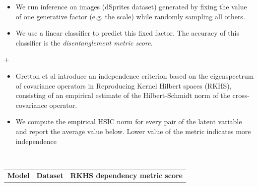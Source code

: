 \documentclass[a0]{a0poster}
\def\Head#1{\begin{center}\noindent{\LARGE\bf\color{Black}#1}\end{center}\bigskip}
\begin{document}
\begin{minipage}[t]{0.32\textwidth}
\Head{Analysis}
    \vspace{1cm}
    \begin{minipage}{1.0\columnwidth}
    \begin{minipage}{1.0\columnwidth}
    \begin{minipage}[t]{0.6\textwidth}
 \Large {}
 \begin{itemize}
 	\item We run inference on images (dSprites dataset) generated by fixing the value of one generative factor (e.g. the scale) while randomly sampling all others.
    \item We use a linear classifier to predict this fixed factor. The accuracy of this classifier is the \emph{disentanglement metric score}.
 \end{itemize}
 \end{minipage}\hfill
 \begin{minipage}[t]{0.37\textwidth}
+ \end{minipage}
 \vspace{1cm}
 \end{minipage}
  \Large {}
  \begin{itemize}
  \item Gretton et al \citep{Gretton:2005:MSD:2101372.2101382} introduce an independence criterion based on the eigenspectrum of covariance operators in Reproducing Kernel Hilbert spaces (RKHS), consisting of an empirical estimate of the Hilbert-Schmidt norm of the cross-covariance operator.
  \item We compute the empirical HSIC norm for every pair of the latent variable and report the average value below. Lower value of the metric indicates more independence
  \end{itemize}
    \vspace{0.1cm}
    \end{minipage}
\vspace{0.1cm} 
\Head{Results}
\vspace{0.1cm}
     {\Large {}}\\[1cm]
     \begin{minipage}{\columnwidth}
     	\Large
        \centering
       \begin{tabular}{|>{\centering}m{10cm}|c|c|}
       	\hline
          \textbf{Model} & \textbf{Dataset} &  \textbf{RKHS dependency metric score}\\

\end{tabular}
\end{minipage}
\end{minipage}
\end{document}
